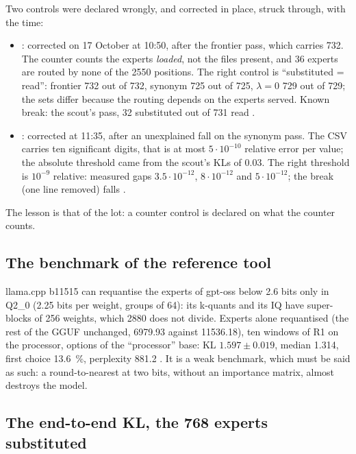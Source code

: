 Two controls were declared wrongly, and corrected in place, struck through, with the time:
\begin{itemize}
\item {}: corrected on 17 October at 10:50, after the frontier pass, which carries 732. The counter counts the experts \emph{loaded}, not the files present, and 36 experts are routed by none of the \num{2550} positions. The right control is ``substituted = read'': frontier 732 out of 732, synonym 725 out of 725, $\lambda = 0$ 729 out of 729; the sets differ because the routing depends on the experts served. Known break: the scout's pass, 32 substituted out of 731 read \mes.
\item {}: corrected at 11:35, after an unexplained fall on the synonym pass. The CSV carries ten significant digits, that is at most $5\cdot 10^{-10}$ relative error per value; the absolute threshold came from the scout's KLs of \num{0.03}. The right threshold is $10^{-9}$ relative: measured gaps $3.5\cdot 10^{-12}$, $8 \cdot 10^{-12}$ and $5\cdot 10^{-12}$; the break (one line removed) falls \mes.
\end{itemize}
The lesson is that of the lot: a counter control is declared on what the counter counts.

\subsection{The benchmark of the reference tool}\label{t3sno:sec:repere}

llama.cpp b11515 \parencite{ggml2026llamacppb11515} can requantise the experts of gpt-oss below \num{2.6} bits only in Q2\_0 (\num{2.25} bits per weight, groups of 64): its k-quants and its IQ have super-blocks of 256 weights, which \num{2880} does not divide. Experts alone requantised (the rest of the GGUF unchanged, \SI{6979.93}{\Mio} against \num{11536.18}), ten windows of R1 on the processor, options of the ``processor'' base: KL $\num{1.597} \pm \num{0.019}$, median \num{1.314}, first choice \SI{13.6}{\percent}, perplexity \num{881.2} \mes. It is a weak benchmark, which must be said as such: a round-to-nearest at two bits, without an importance matrix, almost destroys the model.

\subsection{The end-to-end KL, the 768 experts substituted}\label{t3sno:sec:kl}

